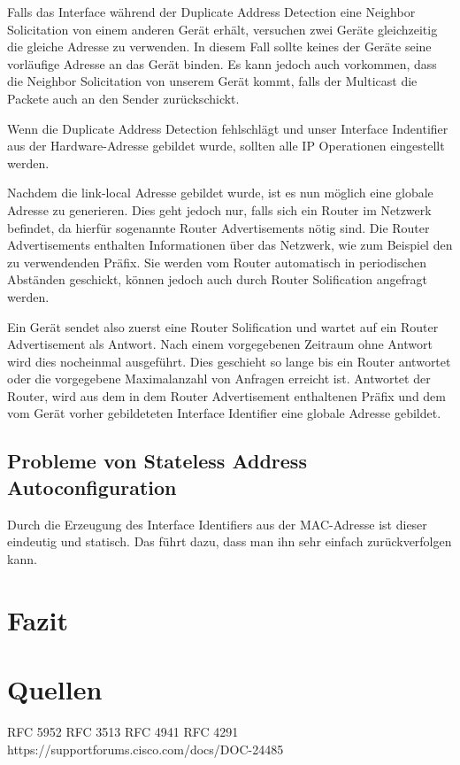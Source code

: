\documentclass[a4paper, 12pt]{scrartcl}
\begin{document}
Falls das Interface während der Duplicate Address Detection eine Neighbor Solicitation von einem anderen Gerät erhält, versuchen zwei Geräte gleichzeitig die gleiche Adresse zu verwenden. In diesem Fall sollte keines der Geräte seine vorläufige Adresse an das Gerät binden. Es kann jedoch auch vorkommen, dass die Neighbor Solicitation von unserem Gerät kommt, falls der Multicast die Packete auch an den Sender zurückschickt.

Wenn die Duplicate Address Detection fehlschlägt und unser Interface Indentifier aus der Hardware-Adresse gebildet wurde, sollten alle IP Operationen eingestellt werden.

Nachdem die link-local Adresse gebildet wurde, ist es nun möglich eine globale Adresse zu generieren. Dies geht jedoch nur, falls sich ein Router im Netzwerk befindet, da hierfür sogenannte Router Advertisements nötig sind. Die Router Advertisements enthalten Informationen über das Netzwerk, wie zum Beispiel den zu verwendenden Präfix.
Sie werden vom Router automatisch in periodischen Abständen geschickt, können jedoch auch durch Router Solification angefragt werden.

Ein Gerät sendet also zuerst eine Router Solification und wartet auf ein Router Advertisement als Antwort. Nach einem vorgegebenen Zeitraum ohne Antwort wird dies nocheinmal ausgeführt. Dies geschieht so lange bis ein Router antwortet oder die vorgegebene Maximalanzahl von Anfragen erreicht ist. 
Antwortet der Router, wird aus dem in dem Router Advertisement enthaltenen Präfix und dem vom Gerät vorher gebildeteten Interface Identifier eine globale Adresse gebildet.



\newpage
\subsection{Probleme von Stateless Address Autoconfiguration}
Durch die Erzeugung des Interface Identifiers aus der MAC-Adresse ist dieser eindeutig und statisch. Das führt dazu, dass man ihn sehr einfach zurückverfolgen kann. 
\section{Fazit}
\newpage

\section{Quellen}
RFC 5952
RFC 3513
RFC 4941
RFC 4291
https://supportforums.cisco.com/docs/DOC-24485
{}


\end{document}
